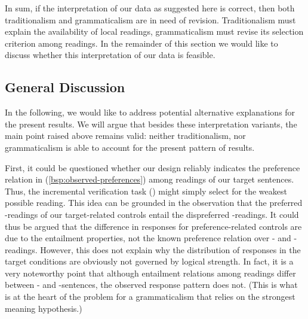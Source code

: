 \documentclass[fleqn,reqno,10pt,draft]{article}
\newcommand{\as}{\acro{as}}
\renewcommand{\es}{\acro{es}}
\newcommand{\lc}{\acro{lc}}
\newcommand{\ec}{\acro{ec}}
\newcommand{\ivt}{\acro{ivt}}
\begin{document}
In sum, if the interpretation of our data as suggested here is
correct, then both traditionalism and grammaticalism are in need of
revision. Traditionalism must explain the availability of local
readings, grammaticalism must revise its selection criterion among
readings. In the remainder of this section we would like to discuss
whether this interpretation of our data is feasible.

\subsection{General Discussion}
\label{sec:discussion}


In the following, we would like to address potential alternative
explanations for the present results. We will argue that besides
these interpretation variants, the main point raised
above remains valid: neither traditionalism, nor grammaticalism
is able to account for the present pattern of results.


First, it could be questioned whether our design reliably 
indicates the preference relation in (\ref{bsp:observed-preferences}) 
among readings of our target sentences. Thus, the incremental verification task
(\ivt) might simply select for the weakest possible reading. This idea
can be grounded in the observation that the preferred \lc-readings
of our target-related controls entail the dispreferred
\ec-readings. It could thus be argued that the difference in responses
for preference-related controls are due to the entailment properties,
not the known preference relation over \lc- and \ec-readings. However, this
does not explain why the distribution of responses in the target
conditions are obviously not governed by logical strength. In fact, it
is a very noteworthy point that although entailment relations among
readings differ between \as- and \es-sentences, the observed response
pattern does not. (This is what is at the heart of the problem for a
grammaticalism that relies on the strongest meaning hypothesis.)
\end{document}
